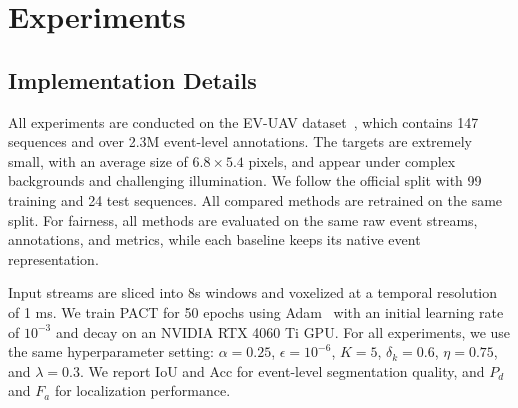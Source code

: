 \documentclass[runningheads]{llncs}
\begin{document}
\section{Experiments}
\subsection{Implementation Details}

All experiments are conducted on the EV-UAV dataset~\cite{chen2025event}, which contains 147 sequences and over 2.3M event-level annotations.
The targets are extremely small, with an average size of $6.8\times5.4$ pixels, and appear under complex backgrounds and challenging illumination.
We follow the official split with 99 training and 24 test sequences.
All compared methods are retrained on the same split.
For fairness, all methods are evaluated on the same raw event streams, annotations, and metrics, while each baseline keeps its native event representation.

Input streams are sliced into 8s windows and voxelized at a temporal resolution of 1 ms.
We train PACT for 50 epochs using Adam~\cite{kingma2014adam} with an initial learning rate of $10^{-3}$ and decay on an NVIDIA RTX 4060 Ti GPU.
For all experiments, we use the same hyperparameter setting: $\alpha=0.25$, $\epsilon=10^{-6}$, $K=5$, $\delta_k=0.6$, $\eta=0.75$, and $\lambda=0.3$.
We report IoU and Acc for event-level segmentation quality, and $P_d$ and $F_a$ for localization performance.
\end{document}
